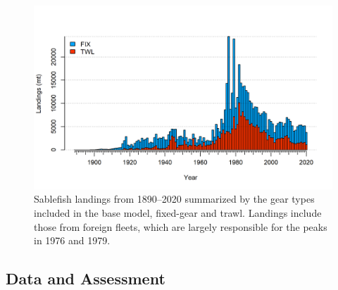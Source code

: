 \documentclass[11pt,
  english,
  a4paper,
]{article}
\begin{document}
\begin{figure}
\centering
\includegraphics[width=1\textwidth,height=1\textheight]{figs/catch2 landings stacked.png}
\caption{Sablefish landings from 1890--2020 summarized by the gear types included in the base model, fixed-gear and trawl. Landings include those from foreign fleets, which are largely responsible for the peaks in 1976 and 1979.}
\end{figure}

\tagmcend\tagstructend

\clearpage


\hypertarget{data-and-assessment}{%
\subsection*{Data and Assessment}\label{data-and-assessment}}

\leavevmode\tagmcend\tagstructend

\end{document}

